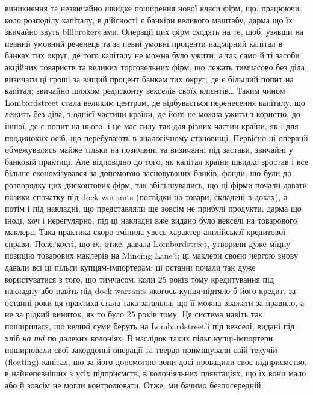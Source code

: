 \parcont{}  %
виникнення та незвичайно швидке поширення нової кляси фірм, що, працюючи
коло розподілу капіталу, в дійсності є банкіри великого маштабу, дарма що
їх звичайно звуть billbrokers’ами. Операції цих фірм сходять на те, щоб,
узявши на певний умовний реченець та за певні умовні проценти надмірний
капітал в банках тих округ, де того капіталу не можна було ужити, а так
само й ті засоби акційних товариств та великих торговельних фірм, що лежать
тимчасово без діла, визичати ці гроші за вищий процент банкам тих округ, де
є більший попит на капітал; звичайно шляхом редисконту векселів своїх клієнтів\dots{}
Таким чином Lombardstreet стала великим центром, де відбувається перенесення
капіталу, що лежить без діла, з однієї частини країни, де його не можна ужити
з користю, до іншої, де є попит на нього: і це має силу так для різних частин
країни, як і для поодиноких осіб, що перебувають в аналогічному становищі.
Первісно ці операції обмежувались майже тільки на позичанні та визичанні
під застави, звичайні у банковій практиці. Але відповідно до того, як капітал
країни швидко зростав і все більше економізувався за допомогою засновуваних
банків, фонди, що були до розпорядку цих дисконтових фірм, так збільшувались,
що ці фірми почали давати позики спочатку під dock warrants (посвідки
на товари, складені в доках), а потім і під накладні, що представляли ще
зовсім не прибулі продукти, дарма що іноді, хоч і нерегулярно, під ці накладні
вже видано було векселі на товарового маклера. Така практика скоро змінила
увесь характер англійської кредитової справи. Полегкості, що їх, отже, давала Lombardstreet,
утворили дуже міцну позицію товарових маклерів на Mincing Lane’i; ці
маклери своєю чергою знову давали всі ці пільги купцям-імпортерам; ці останні
почали так дуже користуватися з того, що тимчасом, коли 25 років тому кредитування
під накладну або навіть під dock warrants якогось купця підтяло б
його кредит, за останні роки ця практика стала така загальна, що її можна
вважати за правило, а не за рідкий виняток, як то було 25 років тому. Ця
система навіть так поширилася, що великі суми беруть на Lombardstreet’i під
векселі, видані під хліб \emph{на пні} по далеких колоніях. В наслідок таких пільг
купці-імпортери поширювали свої закордонні операції та твердо приміщували
свій текучій (floating) капітал, що за його допомогою вони досі провадили своє
підприємство, в найнепевніших з усіх підприємств, в колоніяльних плянтаціях.
що їх вони мало або й зовсім не могли контролювати. Отже, ми бачимо безпосередній
